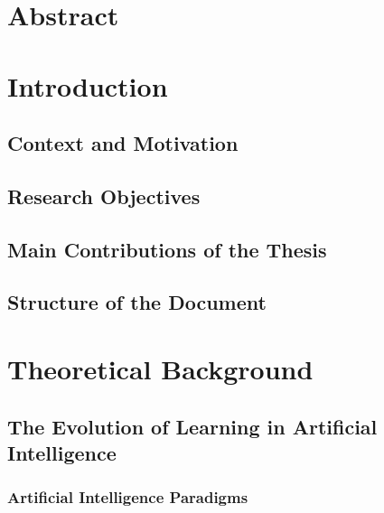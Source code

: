 \documentclass[12pt,a4paper]{report}
\begin{document}

\chapter*{Abstract}


\tableofcontents
\newpage


\chapter{Introduction}

\section{Context and Motivation}

\section{Research Objectives}

\section{Main Contributions of the Thesis}

\section{Structure of the Document}


\chapter{Theoretical Background}

\section{The Evolution of Learning in Artificial Intelligence}

\subsection{Artificial Intelligence Paradigms}
\end{document}
